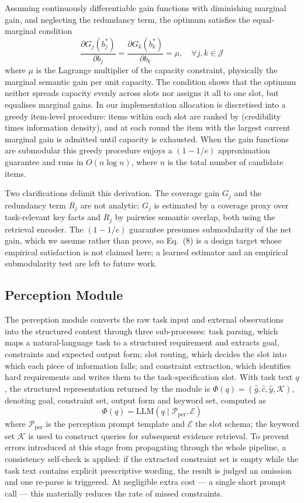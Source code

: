 \documentclass[journal,10pt,a4paper]{IEEEtran}
\begin{document}
Assuming continuously differentiable gain functions with diminishing marginal gain, and neglecting the redundancy term, the optimum satisfies the equal-marginal condition
\begin{equation}
\frac{\partial G_j(b_j^{*})}{\partial b_j}=\frac{\partial G_k(b_k^{*})}{\partial b_k}=\mu,\quad\forall j,k\in\mathcal{J}
\end{equation}
where $\mu$ is the Lagrange multiplier of the capacity constraint, physically the marginal semantic gain per unit capacity. The condition shows that the optimum neither spreads capacity evenly across slots nor assigns it all to one slot, but equalises marginal gains. In our implementation allocation is discretised into a greedy item-level procedure: items within each slot are ranked by (credibility times information density), and at each round the item with the largest current marginal gain is admitted until capacity is exhausted. When the gain functions are submodular this greedy procedure enjoys a $(1-1/e)$ approximation guarantee and runs in $O(n\log n)$, where $n$ is the total number of candidate items.

Two clarifications delimit this derivation. The coverage gain $G_j$ and the redundancy term $R_j$ are not analytic: $G_j$ is estimated by a coverage proxy over task-relevant key facts and $R_j$ by pairwise semantic overlap, both using the retrieval encoder. The $(1-1/e)$ guarantee presumes submodularity of the net gain, which we assume rather than prove, so Eq.~(8) is a design target whose empirical satisfaction is not claimed here; a learned estimator and an empirical submodularity test are left to future work.

\subsection{Perception Module}
The perception module converts the raw task input and external observations into the structured context through three sub-processes: task parsing, which maps a natural-language task to a structured requirement and extracts goal, constraints and expected output form; slot routing, which decides the slot into which each piece of information falls; and constraint extraction, which identifies hard requirements and writes them to the task-specification slot. With task text $q$, the structured representation returned by the module is $\Phi(q)=(\hat{g},\hat{c},\hat{y},\mathcal{K})$, denoting goal, constraint set, output form and keyword set, computed as
\begin{equation}
\Phi(q)=\mathrm{LLM}(q\mid\mathcal{P}_{\mathrm{per}},\mathcal{E})
\end{equation}
where $\mathcal{P}_{\mathrm{per}}$ is the perception prompt template and $\mathcal{E}$ the slot schema; the keyword set $\mathcal{K}$ is used to construct queries for subsequent evidence retrieval. To prevent errors introduced at this stage from propagating through the whole pipeline, a consistency self-check is applied: if the extracted constraint set is empty while the task text contains explicit prescriptive wording, the result is judged an omission and one re-parse is triggered. At negligible extra cost --- a single short prompt call --- this materially reduces the rate of missed constraints.
\end{document}
